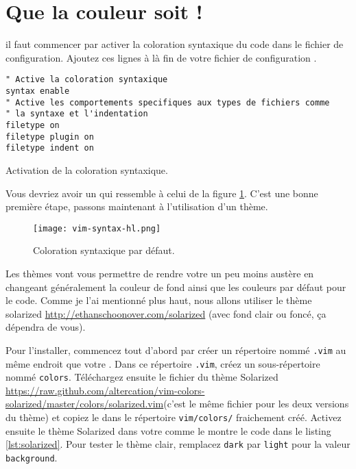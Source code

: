\section{Que la couleur soit !}

 il faut commencer par activer la coloration syntaxique du code dans le fichier de configuration. Ajoutez ces lignes à là fin de votre fichier de configuration \vimrc.

\begin{listing}[H]
\begin{verbatim}
" Active la coloration syntaxique
syntax enable
" Active les comportements specifiques aux types de fichiers comme
" la syntaxe et l'indentation
filetype on
filetype plugin on
filetype indent on
\end{verbatim}
  \caption{Activation de la coloration syntaxique.}
  \label{lst:syntax-hl}
\end{listing}

Vous devriez avoir un \vim qui ressemble à celui de la figure \ref{fig:syntax-hl}. C'est une bonne première étape, passons maintenant à l'utilisation d'un thème.

\begin{figure}%
  \texttt{[image: vim-syntax-hl.png]}
  \caption{Coloration syntaxique par défaut.}
  \label{fig:syntax-hl}
\end{figure}

Les thèmes vont vous permettre de rendre votre \vim un peu moins austère en changeant généralement la couleur de fond ainsi que les couleurs par défaut pour le code. Comme je l'ai mentionné plus haut, nous allons utiliser le thème solarized \url{http://ethanschoonover.com/solarized} (avec fond clair ou foncé, ça dépendra de vous).

Pour l'installer, commencez tout d'abord par créer un répertoire nommé \Verb|.vim| au même endroit que votre \vimrc{}. Dans ce répertoire \Verb|.vim|, créez un sous-répertoire nommé \Verb|colors|. Téléchargez ensuite le fichier du thème Solarized \url{https://raw.github.com/altercation/vim-colors-solarized/master/colors/solarized.vim}(c'est le même fichier pour les deux versions du thème) et copiez le dans le répertoire \Verb|vim/colors/| fraichement créé. Activez ensuite le thème Solarized dans votre \vimrc comme le montre le code dans le listing \ref{lst:solarized}. Pour tester le thème clair, remplacez \Verb|dark| par \Verb|light| pour la valeur \Verb|background|.

